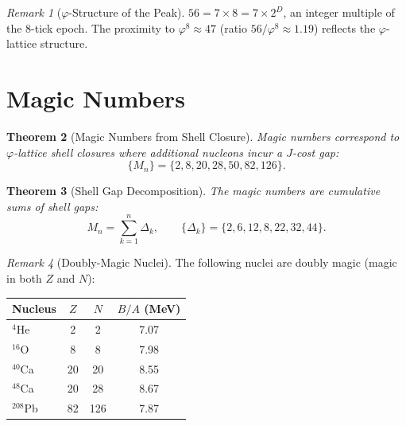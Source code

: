 \documentclass[12pt,a4paper]{article}
\newtheorem{theorem}{Theorem}[section]
\theoremstyle{definition}
\theoremstyle{remark}
\newtheorem{remark}[theorem]{Remark}
\begin{document}
\begin{remark}[$\varphi$-Structure of the Peak]
$56 = 7 \times 8 = 7 \times 2^D$, an integer multiple of the
8-tick epoch.  The proximity to $\varphi^8 \approx 47$ (ratio
$56/\varphi^8 \approx 1.19$) reflects the $\varphi$-lattice
structure.
\end{remark}

\section{Magic Numbers}
\label{sec:magic}

\begin{theorem}[Magic Numbers from Shell Closure]
\label{thm:magic}
Magic numbers correspond to $\varphi$-lattice shell closures
where additional nucleons incur a $J$-cost gap:
\begin{equation}
  \{M_n\} = \{2, 8, 20, 28, 50, 82, 126\}.
\end{equation}
\end{theorem}

\begin{theorem}[Shell Gap Decomposition]
The magic numbers are cumulative sums of shell gaps:
\begin{equation}
  M_n = \sum_{k=1}^{n} \Delta_k, \qquad
  \{\Delta_k\} = \{2, 6, 12, 8, 22, 32, 44\}.
\end{equation}
\end{theorem}

\begin{remark}[Doubly-Magic Nuclei]
The following nuclei are doubly magic (magic in both $Z$ and $N$):
\begin{center}
\renewcommand{\arraystretch}{1.2}
\begin{tabular}{lccc}
\hline
\textbf{Nucleus} & $Z$ & $N$ & $B/A$ (MeV) \\
\hline
${}^{4}$He & 2 & 2 & 7.07 \\
${}^{16}$O & 8 & 8 & 7.98 \\
${}^{40}$Ca & 20 & 20 & 8.55 \\
${}^{48}$Ca & 20 & 28 & 8.67 \\
${}^{208}$Pb & 82 & 126 & 7.87 \\
\hline
\end{tabular}
\end{center}
\end{remark}

\end{document}

